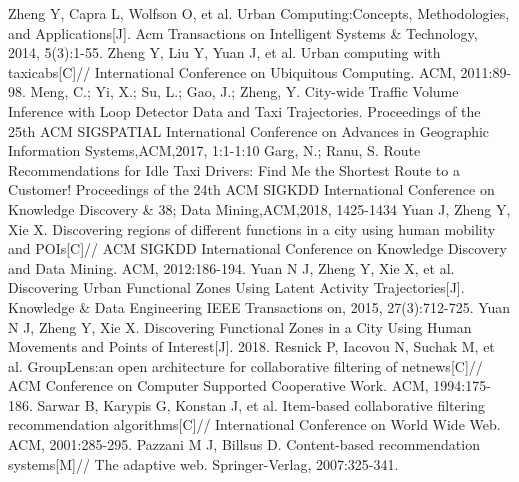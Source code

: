 \documentclass[runningheads]{llncs}
\begin{document}
\begin{thebibliography}{25}
Zheng Y, Capra L, Wolfson O, et al. Urban Computing:Concepts, Methodologies, and Applications[J]. Acm Transactions on Intelligent Systems \& Technology, 2014, 5(3):1-55.
Zheng Y, Liu Y, Yuan J, et al. Urban computing with taxicabs[C]// International Conference on Ubiquitous Computing. ACM, 2011:89-98.
 Meng, C.; Yi, X.; Su, L.; Gao, J.; Zheng, Y. City-wide Traffic Volume Inference with Loop Detector Data and Taxi Trajectories. Proceedings of the 25th ACM SIGSPATIAL International Conference on Advances in Geographic Information Systems,ACM,2017, 1:1-1:10 
Garg, N.; Ranu, S. Route Recommendations for Idle Taxi Drivers: Find Me the Shortest Route to a Customer! Proceedings of the 24th ACM SIGKDD International Conference on Knowledge Discovery \& 38; Data Mining,ACM,2018, 1425-1434 
Yuan J, Zheng Y, Xie X. Discovering regions of different functions in a city using human mobility and POIs[C]// ACM SIGKDD International Conference on Knowledge Discovery and Data Mining. ACM, 2012:186-194.
Yuan N J, Zheng Y, Xie X, et al. Discovering Urban Functional Zones Using Latent Activity Trajectories[J]. Knowledge \& Data Engineering IEEE Transactions on, 2015, 27(3):712-725.
Yuan N J, Zheng Y, Xie X. Discovering Functional Zones in a City Using Human Movements and Points of Interest[J]. 2018.
Resnick P, Iacovou N, Suchak M, et al. GroupLens:an open architecture for collaborative filtering of netnews[C]// ACM Conference on Computer Supported Cooperative Work. ACM, 1994:175-186.
Sarwar B, Karypis G, Konstan J, et al. Item-based collaborative filtering recommendation algorithms[C]// International Conference on World Wide Web. ACM, 2001:285-295.
Pazzani M J, Billsus D. Content-based recommendation systems[M]// The adaptive web. Springer-Verlag, 2007:325-341.

\end{thebibliography}
\end{document}
